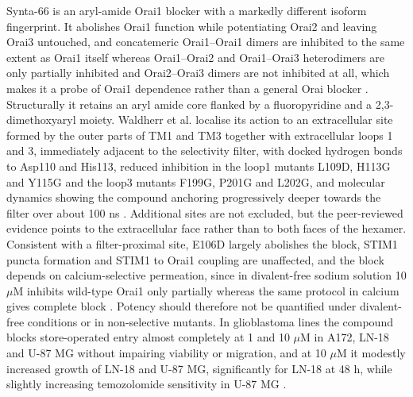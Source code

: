 Synta-66 is an aryl-amide Orai1 blocker with a markedly different isoform fingerprint. It abolishes Orai1 function while potentiating Orai2 and leaving Orai3 untouched, and concatemeric Orai1--Orai1 dimers are inhibited to the same extent as Orai1 itself whereas Orai1--Orai2 and Orai1--Orai3 heterodimers are only partially inhibited and Orai2--Orai3 dimers are not inhibited at all, which makes it a probe of Orai1 dependence rather than a general Orai blocker \cite{ref093}. Structurally it retains an aryl amide core flanked by a fluoropyridine and a 2,3-dimethoxyaryl moiety. Waldherr et al. localise its action to an extracellular site formed by the outer parts of TM1 and TM3 together with extracellular loops 1 and 3, immediately adjacent to the selectivity filter, with docked hydrogen bonds to Asp110 and His113, reduced inhibition in the loop1 mutants L109D, H113G and Y115G and the loop3 mutants F199G, P201G and L202G, and molecular dynamics showing the compound anchoring progressively deeper towards the filter over about 100 ns \cite{ref071}. Additional sites are not excluded, but the peer-reviewed evidence points to the extracellular face rather than to both faces of the hexamer. Consistent with a filter-proximal site, E106D largely abolishes the block, STIM1 puncta formation and STIM1 to Orai1 coupling are unaffected, and the block depends on calcium-selective permeation, since in divalent-free sodium solution 10 \ensuremath{\mu}M inhibits wild-type Orai1 only partially whereas the same protocol in calcium gives complete block \cite{ref071}. Potency should therefore not be quantified under divalent-free conditions or in non-selective mutants. In glioblastoma lines the compound blocks store-operated entry almost completely at 1 and 10 \ensuremath{\mu}M in A172, LN-18 and U-87 MG without impairing viability or migration, and at 10 \ensuremath{\mu}M it modestly increased growth of LN-18 and U-87 MG, significantly for LN-18 at 48 h, while slightly increasing temozolomide sensitivity in U-87 MG \cite{ref071}.


